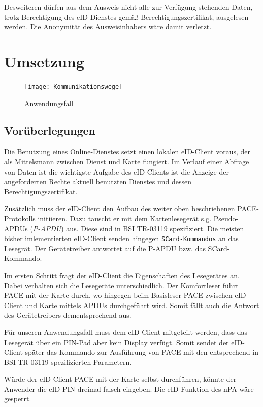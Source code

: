 \documentclass[toc=flat,fontsize=11pt,a4paper,titlepage,headsepline,numbers=noenddot, bibliography=totoc]{scrartcl}
\begin{document}
Desweiteren dürfen aus dem Ausweis nicht alle zur Verfügung stehenden Daten, trotz Berechtigung des eID-Dienstes gemäß Berechtigungszertifikat, 
ausgelesen werden. Die Anonymität des Ausweisinhabers wäre damit verletzt.  

\section{Umsetzung}

\begin{figure}[!htb]
\centering
\texttt{[image: Kommunikationswege]}
\caption{Anwendungsfall}
\label{ov}
\end{figure}

\subsection{Vorüberlegungen}



Die Benutzung eines Online-Dienstes setzt einen lokalen eID-Client voraus, der als Mittelsmann zwischen Dienst und Karte fungiert.
Im Verlauf einer Abfrage von Daten ist die wichtigste Aufgabe des eID-Clients ist die Anzeige der angeforderten Rechte aktuell benutzten Dienstes 
und dessen Berechtigungszertifikat.

Zusätzlich muss der eID-Client den Aufbau des weiter oben beschriebenen PACE-Protokolls initiieren. Dazu tauscht er mit dem Kartenlesegerät
s.g. Pseudo-APDUs (\textit{P-APDU}) aus. Diese sind in BSI TR-03119 spezifiziert. Die meisten bisher imlementierten eID-Client senden hingegen 
\verb+SCard-Kommandos+ an das Lesegrät. Der Gerätetreiber antwortet auf die P-APDU bzw. das SCard-Kommando.  

Im ersten Schritt fragt der eID-Client die Eigenschaften des Lesegerätes an. Dabei verhalten sich die Lesegeräte unterschiedlich.
Der Komfortleser führt PACE mit der Karte durch, wo hingegen beim Basisleser PACE zwischen eID-Client und
Karte mittels APDUs durchgeführt wird. Somit fällt auch die Antwort des Gerätetreibers dementsprechend aus.

Für unseren Anwendungsfall muss dem eID-Client mitgeteilt werden, dass das Lesegerät über ein PIN-Pad aber kein Display verfügt. Somit sendet der
eID-Client später das Kommando zur Ausführung von PACE mit den entsprechend in BSI TR-03119 spezifizierten Parametern.

Würde der eID-Client PACE mit der Karte selbst durchführen, könnte der Anwender die eID-PIN dreimal falsch eingeben. Die eID-Funktion des nPA
wäre gesperrt.
\end{document}
